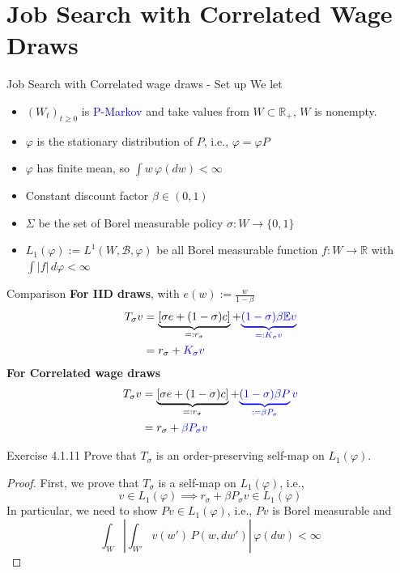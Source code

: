 \section{Job Search with Correlated Wage Draws}
\begin{frame}{Job Search with Correlated wage draws -  Set up}
    We let 
    \begin{itemize}
        \item $(W_t)_{t\ge 0}$ is \textcolor{blue}{P-Markov} and take values from $W\subset \mathbb{R}_+$, $W$ is nonempty.
        \item $\varphi$ is the stationary distribution of $P$, i.e., $\varphi = \varphi P$
        \item $\varphi$ has finite mean, so $\int w\,\varphi(dw)<\infty$
        \item Constant discount factor $\beta\in(0,1)$
        \item $\Sigma$ be the set of Borel measurable policy $\sigma: W\to \{0,1\}$
         \item $L_1(\varphi):= L^1(W,\mathcal{B}, \varphi)$ be all Borel measurable function $f:W\to \mathbb{R}$ with $\int|f|\,d\varphi<\infty$
    \end{itemize}
\end{frame}

\begin{frame}{Comparison}
\textbf{For IID draws}, with $e(w) :=\frac{w}{1-\beta}$
\begin{align*}
    T_\sigma v &= \underbrace{[\sigma e+(1-\sigma)c]}_{=:r_\sigma} + \textcolor{blue}{\underbrace{(1-\sigma)\beta \mathbb{E}v}_{=:K_\sigma v}}\\
    &= r_\sigma + \textcolor{blue}{K_\sigma v}
\end{align*}
\textbf{For Correlated wage draws}
\begin{align*}
    T_\sigma v &= \underbrace{[\sigma e+(1-\sigma)c]}_{=:r_\sigma} + \textcolor{blue}{\underbrace{(1-\sigma)\beta P}_{:=\beta P_\sigma}v}\\
    &= r_\sigma +\textcolor{blue}{\beta P_\sigma v}
\end{align*}
\end{frame}
\begin{frame}{Exercise 4.1.11}
Prove that $T_\sigma$ is an order-preserving self-map on $L_1(\varphi)$.
\begin{proof}
    First, we prove that $T_\sigma$ is a self-map on $L_1(\varphi)$, i.e.,
    $$
    v\in L_1(\varphi)\implies r_\sigma +\beta P_\sigma v\in L_1(\varphi)
    $$
    In particular, we need to show $Pv\in L_1(\varphi)$, i.e., $Pv$ is Borel measurable and
    $$
    \int_{W}\left|\int_{W'} v(w')\, P(w, dw')\right|\,\varphi(dw)<\infty
    $$
\end{proof}
\end{frame}

